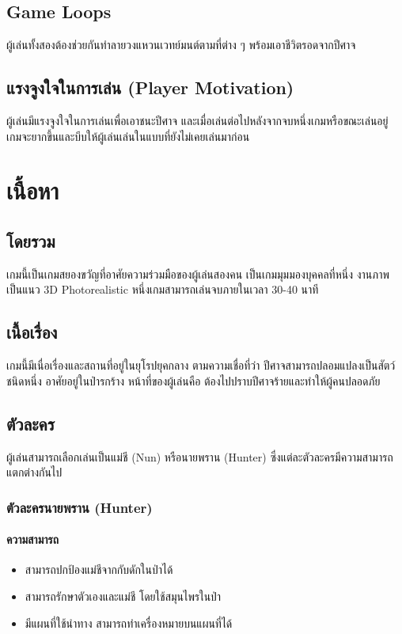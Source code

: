 \subsection{Game Loops}

ผู้เล่นทั้งสองต้องช่วยกันทำลายวงแหวนเวทย์มนต์ตามที่ต่าง ๆ พร้อมเอาชีวิตรอดจากปีศาจ

\subsection{แรงจูงใจในการเล่น (Player Motivation)}

ผู้เล่นมีแรงจูงใจในการเล่นเพื่อเอาชนะปีศาจ และเมื่อเล่นต่อไปหลังจากจบหนึ่งเกมหรือขณะเล่นอยู่ เกมจะยากขึ้นและบีบให้ผู้เล่นเล่นในแบบที่ยังไม่เคยเล่นมาก่อน

\section{เนื้อหา}

\subsection{โดยรวม}

เกมนี้เป็นเกมสยองขวัญที่อาศัยความร่วมมือของผู้เล่นสองคน เป็นเกมมุมมองบุคคลที่หนึ่ง งานภาพเป็นแนว 3D Photorealistic หนึ่งเกมสามารถเล่นจบภายในเวลา 30-40 นาที

\subsection{เนื้อเรื่อง}

เกมนี้มีเนื่อเรื่องและสถานที่อยู่ในยุโรปยุคกลาง ตามความเชื่อที่ว่า ปีศาจสามารถปลอมแปลงเป็นสัตว์ชนิดหนึ่ง อาศัยอยู่ในป่ารกร้าง หน้าที่ของผู้เล่นคือ ต้องไปปราบปีศาจร้ายและทำให้ผู้คนปลอดภัย

\subsection{ตัวละคร}

ผู้เล่นสามารถเลือกเล่นเป็นแม่ชี (Nun) หรือนายพราน (Hunter) ซึ่งแต่ละตัวละครมีความสามารถแตกต่างกันไป

\subsubsection{ตัวละครนายพราน (Hunter)}

\paragraph{ความสามารถ}
\begin{itemize}
  \item สามารถปกป้องแม่ชีจากกับดักในป่าได้
  \item สามารถรักษาตัวเองและแม่ชี โดยใช้สมุนไพรในป่า
  \item มีแผนที่ใช้นำทาง สามารถทำเครื่องหมายบนแผนที่ได้
\end{itemize}

